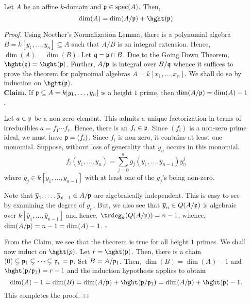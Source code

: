 \begin{theorem}
    Let $A$ be an affine $k$-domain and $\mathfrak p\in\operatorname{spec}(A)$. Then, 
    \begin{equation*}
        \dim(A) = \dim(A/\frakp) + \hght(\frakp)
    \end{equation*}
\end{theorem}
\begin{proof}
    Using Noether's Normalization Lemma, there is a polynomial algebra $B = k[y_1,\dots,y_n]\subseteq A$ such that $A/B$ is an integral extension. Hence, $\dim(A) = \dim(B)$. Let $\mathfrak q = \mathfrak p\cap B$. Due to the Going Down Theorem, $\hght(\frakq) = \hght(\frakp)$. Further, $A/\mathfrak p$ is integral over $B/\mathfrak q$ whence it suffices to prove the theorem for polynoimal algebras $A = k[x_1,\dots,x_n]$. We shall do so by induction on $\hght(\frakp)$.\\

    \noindent\textbf{Claim.} If $\mathfrak p\subseteq A = k[y_1,\dots,y_n]$ is a height $1$ prime, then $\dim(A/\mathfrak p) = \dim(A) - 1$.

    Let $a\in\mathfrak p$ be a non-zero element. This admits a unique factorization in terms of irreducibles $a = f_1\cdots f_r$. Hence, there is an $f_i\in\mathfrak p$. Since $(f_i)$ is a non-zero prime ideal, we must have $\mathfrak p = (f_i)$. Since $f_i$ is non-zero, it contains at least one monomial. Suppose, without loss of generality that $y_n$ occurs in this monomial.
    \begin{equation*}
        f_i(y_1,\dots,y_n) = \sum_{j = 0}^d g_j(y_1,\dots,y_{n - 1})y_n^j
    \end{equation*}
    where $g_j\in k[y_1,\dots,y_{n - 1}]$ with at least one of the $g_j$'s being non-zero. 

    Note that $\overline y_1,\dots,\overline y_{n - 1}\in A/\mathfrak p$ are algebraically independent. This is easy to see by examining the degree of $y_n$. But, we also see that $\overline y_n\in Q(A/\mathfrak p)$ is algebraic over $k[\overline y_1,\dots,\overline y_{n - 1}]$ and hence, $\trdeg_k(Q(A/\frakp)) = n - 1$, whence, $\dim(A/\mathfrak p) = n - 1 = \dim(A) - 1$. $\square$

    From the Claim, we see that the theorem is true for all height $1$ primes. We shall now induct on $\hght(p)$. Let $r = \hght(\frakp)$. Then, there is a chain $(0)\subsetneq\mathfrak p_1\subsetneq\dots\subsetneq\mathfrak p_r = \mathfrak p$. Set $B = A/\mathfrak p_1$. Then, $\dim(B) = \dim(A) - 1$ and $\hght(\frakp/\frakp_1) = r - 1$ and the induction hypothesis applies to obtain 
    \begin{equation*}
        \dim(A) - 1 = \dim(B) = \dim(A/\frakp) + \hght(\frakp/\frakp_1) = \dim(A/\frakp) + \hght(\frakp) - 1.
    \end{equation*}
    This completes the proof.
\end{proof}


